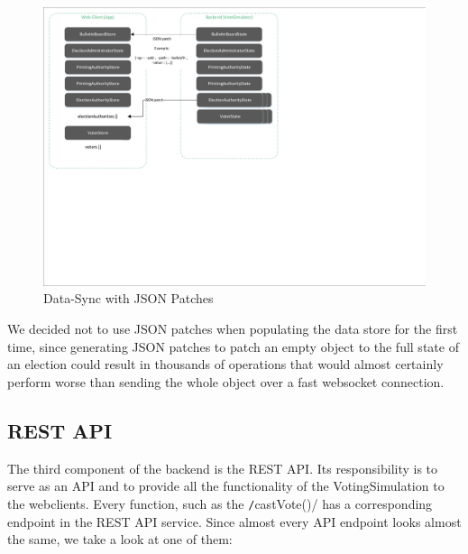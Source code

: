 \begin{figure}[h!]
\begin{center}
\includegraphics[scale=0.60]{assets/datastores_jsonpatch.pdf}
\caption{Data-Sync with JSON Patches}
\end{center}
\end{figure}

We decided not to use JSON patches when populating the data store for the first time, since generating JSON patches to patch an empty object to the full state of an election could result in thousands of operations that would almost certainly perform worse than sending the whole object over a fast websocket connection.

\subsection{REST API}
The third component of the backend is the REST API. Its responsibility is to serve as an API and to provide all the functionality of the VotingSimulation to the webclients. Every function, such as the \texttt/castVote()/ has a corresponding endpoint in the REST API service. Since almost every API endpoint looks almost the same, we take a look at one of them:

